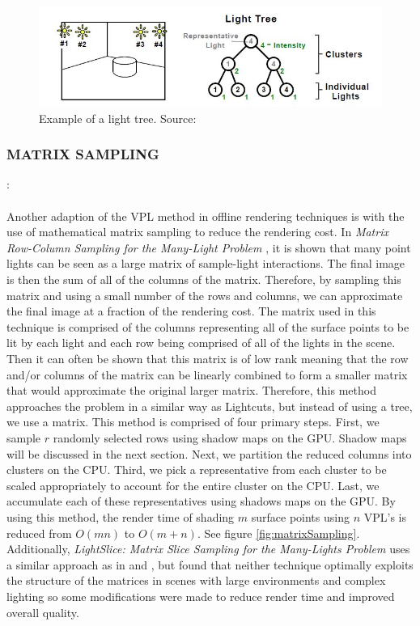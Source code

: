 \begin{figure}[h!]
  \centering
    \includegraphics[width=1.0\textwidth]{lightTree.jpg}
  \caption{Example of a light tree. Source: \protect\cite{Walter2005a}}
	\label{fig:lightTree}
\end{figure}

\subsubsection{MATRIX SAMPLING}: 
\paragraph{}
Another adaption of the VPL method in offline rendering techniques is with the use of mathematical matrix sampling to reduce the rendering cost.  In \textit{Matrix Row-Column Sampling for the Many-Light Problem} \cite{Havsan2007}, it is shown that many point lights can be seen as a large matrix of sample-light interactions.  The final image is then the sum of all of the columns of the matrix.  Therefore, by sampling this matrix and using a small number of the rows and columns, we can approximate the final image at a fraction of the rendering cost.  The matrix used in this technique is comprised of the columns representing all of the surface points to be lit by each light and each row being comprised of all of the lights in the scene.  Then it can often be shown that this matrix is of low rank meaning that the row and/or columns of the matrix can be linearly combined to form a smaller matrix that would approximate the original larger matrix.  Therefore, this method approaches the problem in a similar way as Lightcuts, but instead of using a tree, we use a matrix.  This method is comprised of four primary steps.  First, we sample $r$ randomly selected rows using shadow maps on the GPU.  Shadow maps will be discussed in the next section.  Next, we partition the reduced columns into clusters on the CPU.  Third, we pick a representative from each cluster to be scaled appropriately to account for the entire cluster on the CPU.  Last, we accumulate each of these representatives using shadows maps on the GPU.  By using this method, the render time of shading $m$ surface points using $n$ VPL's is reduced from $O(mn)$ to $O(m+n)$.  See figure \ref{fig:matrixSampling}.  Additionally, \textit{LightSlice: Matrix Slice Sampling for the Many-Lights Problem} \cite{Ou2011} uses a similar approach as in \cite{Havsan2007} and \cite{Walter2005a}, but found that neither technique optimally exploits the structure of the matrices in scenes with large environments and complex lighting so some modifications were made to reduce render time and improved overall quality.

